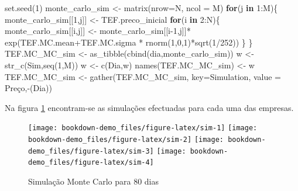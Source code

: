 \documentclass[
  12pt,
  a4paper,
  openany]{book}
\newenvironment{Shaded}{\begin{snugshade}}{\end{snugshade}}
\newcommand{\AttributeTok}[1]{\textcolor[rgb]{0.77,0.63,0.00}{#1}}
\newcommand{\ControlFlowTok}[1]{\textcolor[rgb]{0.13,0.29,0.53}{\textbf{#1}}}
\newcommand{\DecValTok}[1]{\textcolor[rgb]{0.00,0.00,0.81}{#1}}
\newcommand{\FunctionTok}[1]{\textcolor[rgb]{0.00,0.00,0.00}{#1}}
\newcommand{\NormalTok}[1]{#1}
\newcommand{\OtherTok}[1]{\textcolor[rgb]{0.56,0.35,0.01}{#1}}
\newcommand{\SpecialCharTok}[1]{\textcolor[rgb]{0.00,0.00,0.00}{#1}}
\newcommand{\StringTok}[1]{\textcolor[rgb]{0.31,0.60,0.02}{#1}}
\theoremstyle{definition}
\theoremstyle{definition}
\theoremstyle{definition}
\theoremstyle{remark}
\begin{document}
\begin{Shaded}
\begin{Highlighting}[]
\FunctionTok{set.seed}\NormalTok{(}\DecValTok{1}\NormalTok{)}
\NormalTok{monte\_carlo\_sim }\OtherTok{\textless{}{-}} \FunctionTok{matrix}\NormalTok{(}\AttributeTok{nrow=}\NormalTok{N, }\AttributeTok{ncol =}\NormalTok{ M)}
\ControlFlowTok{for}\NormalTok{(j }\ControlFlowTok{in} \DecValTok{1}\SpecialCharTok{:}\NormalTok{M)\{}
\NormalTok{  monte\_carlo\_sim[[}\DecValTok{1}\NormalTok{,j]] }\OtherTok{\textless{}{-}}\NormalTok{ TEF.preco\_inicial}
  \ControlFlowTok{for}\NormalTok{(i }\ControlFlowTok{in} \DecValTok{2}\SpecialCharTok{:}\NormalTok{N)\{}
\NormalTok{    monte\_carlo\_sim[[i,j]] }\OtherTok{\textless{}{-}}\NormalTok{ monte\_carlo\_sim[[i}\DecValTok{{-}1}\NormalTok{,j]]}\SpecialCharTok{*}
      \FunctionTok{exp}\NormalTok{(TEF.MC.mean}\SpecialCharTok{+}\NormalTok{TEF.MC.sigma }\SpecialCharTok{*}
            \FunctionTok{rnorm}\NormalTok{(}\DecValTok{1}\NormalTok{,}\DecValTok{0}\NormalTok{,}\DecValTok{1}\NormalTok{)}\SpecialCharTok{*}\FunctionTok{sqrt}\NormalTok{(}\DecValTok{1}\SpecialCharTok{/}\DecValTok{252}\NormalTok{))}
\NormalTok{  \}}
\NormalTok{\}}
\NormalTok{TEF.MC\_MC\_sim }\OtherTok{\textless{}{-}} \FunctionTok{as\_tibble}\NormalTok{(}\FunctionTok{cbind}\NormalTok{(dia,monte\_carlo\_sim))}
\NormalTok{w }\OtherTok{\textless{}{-}} \FunctionTok{str\_c}\NormalTok{(}\StringTok{\textquotesingle{}Sim\textquotesingle{}}\NormalTok{,}\FunctionTok{seq}\NormalTok{(}\DecValTok{1}\NormalTok{,M))}
\NormalTok{w }\OtherTok{\textless{}{-}} \FunctionTok{c}\NormalTok{(}\StringTok{\textquotesingle{}Dia\textquotesingle{}}\NormalTok{,w)}
\FunctionTok{names}\NormalTok{(TEF.MC\_MC\_sim) }\OtherTok{\textless{}{-}}\NormalTok{ w}
\NormalTok{TEF.MC\_MC\_sim }\OtherTok{\textless{}{-}} \FunctionTok{gather}\NormalTok{(TEF.MC\_MC\_sim, }\AttributeTok{key=}\StringTok{\textquotesingle{}Simulation\textquotesingle{}}\NormalTok{, }\AttributeTok{value =} \StringTok{\textquotesingle{}Preço\textquotesingle{}}\NormalTok{,}\SpecialCharTok{{-}}\NormalTok{(Dia))}
\end{Highlighting}
\end{Shaded}

\normalsize

Na figura \ref{fig:sim} encontram-se as simulações efectuadas para cada uma das empresas.

\begin{figure}

{\centering \texttt{[image: bookdown-demo\_files/figure-latex/sim-1]} \texttt{[image: bookdown-demo\_files/figure-latex/sim-2]} \texttt{[image: bookdown-demo\_files/figure-latex/sim-3]} \texttt{[image: bookdown-demo\_files/figure-latex/sim-4]} 

}

\caption{Simulação Monte Carlo para 80 dias}\label{fig:sim}
\end{figure}
\FloatBarrier
\centering
\end{document}
